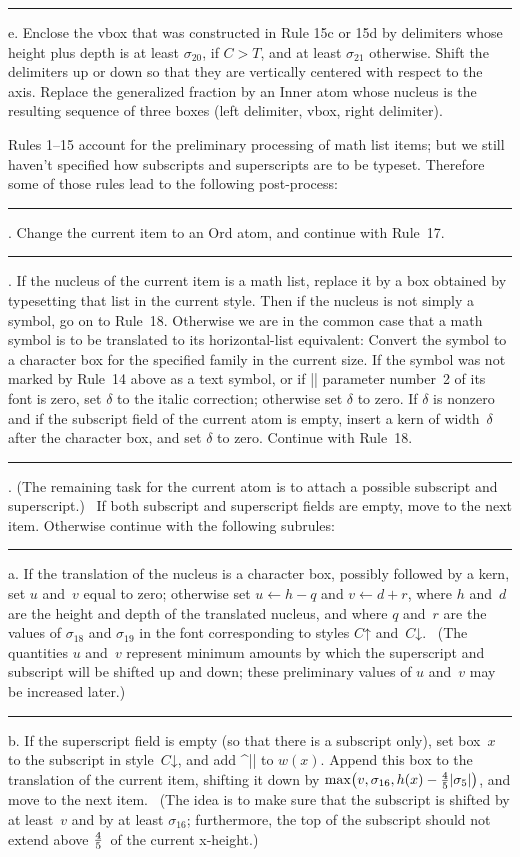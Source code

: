 \rule 15e. Enclose the vbox that was constructed in Rule 15c or 15d by
delimiters whose height plus depth is at least $\sigma_{20}$, if $C>T$, and at
least $\sigma_{21}$ otherwise. Shift the delimiters up or down so that they are
vertically centered with respect to the axis. Replace the generalized
fraction by an Inner atom whose nucleus is the resulting sequence of three boxes
(left delimiter, vbox, right delimiter).

\bigbreak\noindent
Rules 1--15 account for the preliminary processing of math list items;
but we still haven't specified how subscripts and superscripts are to be
typeset. Therefore some of those rules lead to the following post-process:

\rule 16. Change the current item to an Ord atom, and continue with Rule~17.

\rule 17. If the nucleus of the current item is a math list, replace it by
a box obtained by typesetting that list in the current style.  Then if the
nucleus is not simply a symbol, go on to Rule~18.  Otherwise we are in the
common case that a math symbol is to be translated to its horizontal-list
equivalent: Convert the symbol to a character box for the specified family
in the current size. If the symbol was not marked by Rule~14 above as a
text symbol, or if\/ |\fontdimen| parameter number~2 of its font is zero, set
$\delta$ to the italic correction; otherwise set $\delta$ to zero. If
$\delta$ is nonzero and if the subscript field of the current atom is
empty, insert a kern of width~$\delta$ after the character box, and set
$\delta$ to zero. Continue with Rule~18.

\rule 18. (The remaining task for the current atom is to attach a possible
subscript and superscript.) \ If both subscript and superscript fields
are empty, move to the next item. Otherwise continue with the following
subrules:

\rule 18a. If the translation of the nucleus is a character box, possibly
followed by a kern, set $u$ and~$v$ equal to zero; otherwise set
$u\leftarrow h-q$ and $v\leftarrow d+r$, where $h$ and~$d$ are the height
and depth of the translated nucleus, and where $q$ and~$r$ are the values
of $\sigma_{18}$ and $\sigma_{19}$ in the font corresponding to styles
$C\mathord\uparrow$ and~$C\mathord\downarrow$.  \ (The quantities $u$
and~$v$ represent minimum amounts by which the superscript and subscript
will be shifted up and down; these preliminary values of $u$ and~$v$ may
be increased later.)

\rule 18b. If the superscript field is empty (so that there is a subscript
only), set box~$x$ to the subscript in style~$C\mathord\downarrow$, and add
^|\scriptspace| to $w(x)$. Append this box to the translation of the
current item, shifting it down by $\max\bigl(v,\sigma_{16},h(x)-{4\over5}
\vert\sigma_5\vert\bigr)$, and move to the next item. \ (The idea is
to make sure that the subscript is shifted by at least~$v$ and by at
least $\sigma_{16}$; furthermore, the top of the subscript should not extend
above $4\over5$~of the current x-height.)

